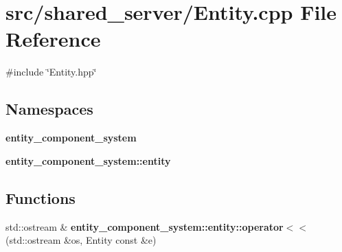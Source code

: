 \section{src/shared\+\_\+server/\+Entity.cpp File Reference}
\label{server_2_entity_8cpp}
{\ttfamily \#include \char`\"{}Entity.\+hpp\char`\"{}}\newline
\subsection*{Namespaces}
\begin{DoxyCompactItemize}
\item 
 {\bf entity\+\_\+component\+\_\+system}
\item 
 {\bf entity\+\_\+component\+\_\+system\+::entity}
\end{DoxyCompactItemize}
\subsection*{Functions}
\begin{DoxyCompactItemize}
\item 
std\+::ostream \& {\bf entity\+\_\+component\+\_\+system\+::entity\+::operator$<$$<$} (std\+::ostream \&os, Entity const \&e)
\end{DoxyCompactItemize}
